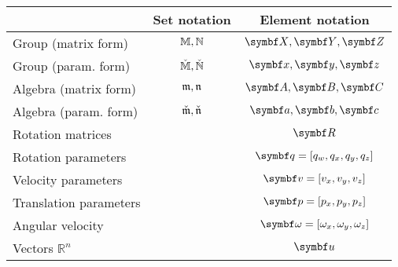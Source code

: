 \begin{tabular}{lcc}
  \toprule
                         & Set notation & Element notation                           \\
  \midrule
  Group (matrix form)    & $\mathbb{M}, \mathbb{N}$     & $\X, \Y, \Z$                               \\
  Group (param. form)    & $\check{\mathbb{M}}, \check{\mathbb{N}}$   & $\x, \y, \z$                               \\
  Algebra (matrix form)  & $\mathfrak{m}, \mathfrak{n}$   & $\A, \B, \C$                               \\
  Algebra (param. form)  & $\check{\mathfrak{m}}, \check{\mathfrak{n}}$ & $\a, \b, \c$                               \\
  Rotation matrices      &              & $\bR$                                      \\
  Rotation parameters    &              & $\bq = [q_w, q_x, q_y, q_z]$               \\
  Velocity parameters    &              & $\bv = [v_x, v_y, v_z]$                    \\
  Translation parameters &              & $\bp = [p_x, p_y, p_z]$                    \\
  Angular velocity       &              & $\bomega = [\omega_x, \omega_y, \omega_z]$ \\
  Vectors $\mathbb{R}^n$ &              & $\bu$                                      \\
  \bottomrule
\end{tabular}

